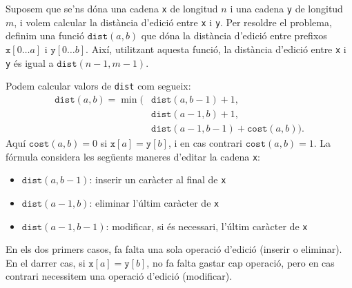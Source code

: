Suposem que se'ns dóna una cadena \texttt{x}
de longitud $n$ i una cadena \texttt{y} de longitud $m$,
i volem calcular la distància d'edició entre
\texttt{x} i \texttt{y}.
Per resoldre el problema, definim una funció
$\texttt{dist}(a,b)$ que dóna
la distància d'edició entre prefixos
$\texttt{x}[0 \ldots a]$ i $\texttt{y}[0 \ldots b]$.
Així, utilitzant aquesta funció, la distància d'edició
entre \texttt{x} i \texttt{y} és igual a $\texttt{dist}(n-1,m-1)$.

Podem calcular valors de \texttt{dist}
com segueix:
\begin{equation*}
\begin{split}
\texttt{dist}(a,b) = \min(& \texttt{dist}(a,b-1)+1, \\
                           & \texttt{dist}(a-1,b)+1, \\
                           & \texttt{dist}(a-1,b-1)+\texttt{cost}(a,b)).
\end{split}
\end{equation*}
Aquí $\texttt{cost}(a,b)=0$ si $\texttt{x}[a]=\texttt{y}[b]$,
i en cas contrari $\texttt{cost}(a,b)=1$.
La fórmula considera les següents maneres
d'editar la cadena \texttt{x}:
\begin{itemize}
\item $\texttt{dist}(a,b-1)$: inserir un caràcter al final de \texttt{x}
\item $\texttt{dist}(a-1,b)$: eliminar l'últim caràcter de \texttt{x}
\item $\texttt{dist}(a-1,b-1)$: modificar, si és necessari, l'últim caràcter
  de \texttt{x}
\end{itemize}
En els dos primers casos, fa falta una sola operació d'edició
(inserir o eliminar).
En el darrer cas, si $\texttt{x}[a]=\texttt{y}[b]$,
no fa falta gastar cap operació, pero en cas contrari
necessitem una operació d'edició (modificar).

